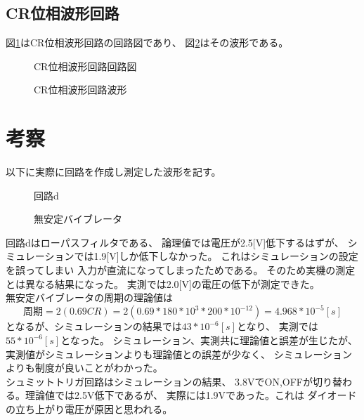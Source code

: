 \documentclass{jsarticle}
\begin{document}
\subsection{CR位相波形回路}
図\ref{crkairo}はCR位相波形回路の回路図であり、
図\ref{crhakei}はその波形である。
\begin{figure}[htpb]
				\centering
				\caption{CR位相波形回路回路図}
				\label{crkairo}
\end{figure}
\begin{figure}[htpb]
				\centering
				\caption{CR位相波形回路波形}
				\label{crhakei}
\end{figure}

\section{考察}
以下に実際に回路を作成し測定した波形を記す。
\begin{figure}[htbp]
		\centering
		\caption{回路d}
		\label{dskairor}
\end{figure}

\begin{figure}[htbp]
		\centering
		\caption{無安定バイブレータ}
		\label{mbkairou}
\end{figure}

回路dはローパスフィルタである、
論理値では電圧が2.5[V]低下するはずが、
シミュレーションでは1.9[V]しか低下しなかった。
これはシミュレーションの設定を誤ってしまい
入力が直流になってしまったためである。
そのため実機の測定とは異なる結果になった。
実測では2.0[V]の電圧の低下が測定できた。\\

無安定バイブレータの周期の理論値は
\[周期=2(0.69CR)=2(0.69*180*10^{3}*200*10^{-12})=4.968*10^{-5}[s]\]
となるが、シミュレーションの結果では$43*10^{-6}[s]$となり、
実測では$55*10^{-6}[s]$となった。
シミュレーション、実測共に理論値と誤差が生じたが、
実測値がシミュレーションよりも理論値との誤差が少なく、
シミュレーションよりも制度が良いことがわかった。\\

シュミットトリガ回路はシミュレーションの結果、
3.8VでON,OFFが切り替わる。理論値では2.5V低下であるが、
実際には1.9Vであった。これは
ダイオードの立ち上がり電圧が原因と思われる。\\
\end{document}
